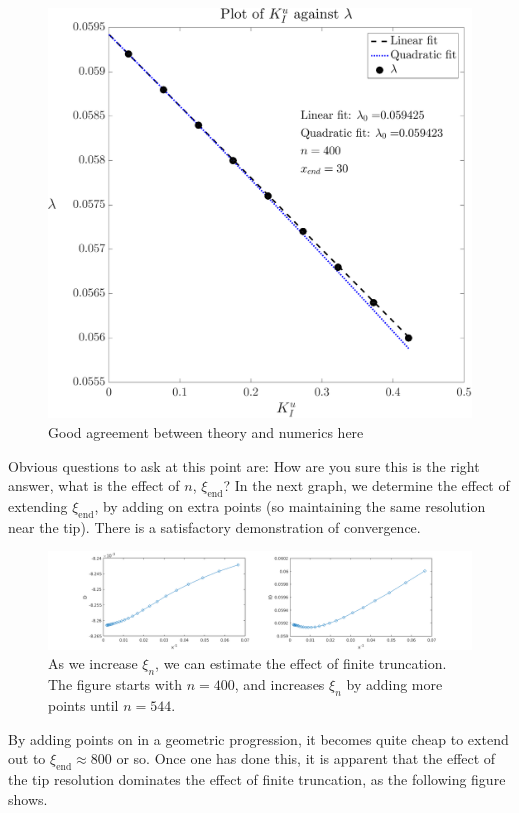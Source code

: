 \documentclass{jfm}
\begin{document}
\begin{figure}
  \centerline{\includegraphics[scale=0.3]{./../../Graphs/l0.pdf}}
  \caption{Good agreement between theory and numerics here}
\end{figure}

Obvious questions to ask at this point are: How are you sure this is the right
answer, what is the effect of $n$,  $\xi_{\mathrm{end}}$? 
In the next graph, we determine the effect of extending $\xi_{\mathrm{end}}$,
by adding on extra points (so maintaining the same resolution near the tip).
There is a satisfactory demonstration of convergence.
\begin{figure}
  \centerline{\includegraphics[scale=0.5]{./../../Graphs/xend-march.png}}
  \caption{As we increase $\xi_{n}$, we can estimate the effect of finite 
           truncation. The figure starts with $n=400$, and increases $\xi_n$
           by adding more points until $n=544$.}
\end{figure}

By adding points on in a geometric progression, it becomes quite cheap to
extend out to $\xi_{\mbox{end}} \approx 800$ or so. Once one has done this,
it is apparent that the effect of the tip resolution dominates the effect
of finite truncation, as the following figure shows.
\end{document}
